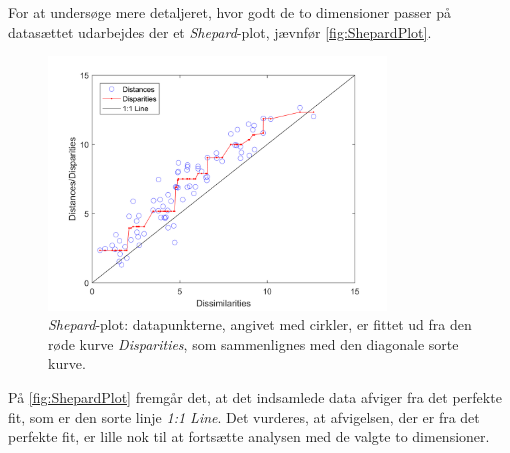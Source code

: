 For at undersøge mere detaljeret, hvor godt de to dimensioner passer på datasættet udarbejdes der et \textit{Shepard}-plot, jævnfør \autoref{fig:ShepardPlot}.
%
\begin{figure}[H]
\centering
\includegraphics[width = 0.8\textwidth]{Figure/Sheppard_plot.png} 
\caption{\textit{Shepard}-plot: datapunkterne, angivet med cirkler, er fittet ud fra den røde kurve \textit{Disparities}, som sammenlignes med den diagonale sorte kurve.}
\label{fig:ShepardPlot}
\end{figure}
\noindent
%
På \autoref{fig:ShepardPlot} fremgår det, at det indsamlede data afviger fra det perfekte fit, som er den sorte linje \textit{1:1 Line}. Det vurderes, at afvigelsen, der er fra det perfekte fit, er lille nok til at fortsætte analysen med de valgte to dimensioner. 
%
